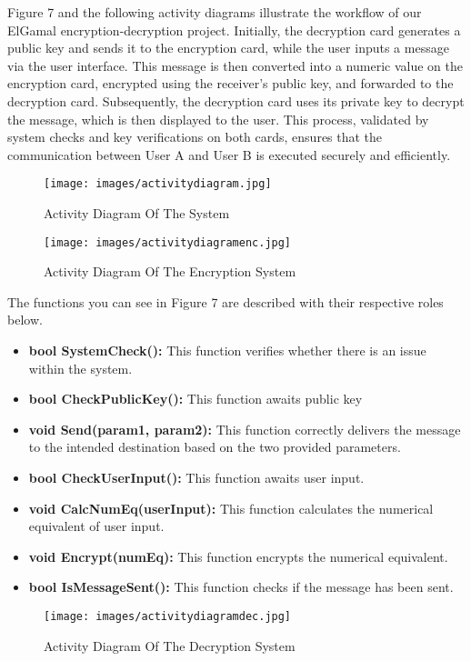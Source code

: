 \documentclass[12pt]{article}
\begin{document}
	Figure 7 and the following activity diagrams illustrate the workflow of our ElGamal encryption-decryption project. Initially, the decryption card generates a public key and sends it to the encryption card, while the user inputs a message via the user interface. This message is then converted into a numeric value on the encryption card, encrypted using the receiver's public key, and forwarded to the decryption card. Subsequently, the decryption card uses its private key to decrypt the message, which is then displayed to the user. This process, validated by system checks and key verifications on both cards, ensures that the communication between User A and User B is executed securely and efficiently.
	\begin{figure}[H]
		\centering
		\label{Uml Diagram Of The System}
		\texttt{[image: images/activitydiagram.jpg]}\\[0.5 cm]	
		\caption{Activity Diagram Of The System} 		
	\end{figure}
	\newpage
	\begin{figure}[H]
		\centering
		\label{Enc Diagram}
		\texttt{[image: images/activitydiagramenc.jpg]}\\[0.5 cm]	
		\caption{Activity Diagram Of The Encryption System } 		
	\end{figure}
	The functions you can see in Figure 7 are described with their respective roles below.
	\begin{itemize}
		\item \textbf{bool SystemCheck():} This function verifies whether there is an issue within the system.
		\item \textbf{bool CheckPublicKey():} This function awaits public key
		\item \textbf{void Send(param1, param2):} 
		This function correctly delivers the message to the intended destination based on the two provided parameters.
		\item \textbf{bool CheckUserInput():}  This function awaits user input.
		\item \textbf{void CalcNumEq(userInput):} This function calculates the numerical equivalent of user input.
		\item \textbf{void Encrypt(numEq):} This function encrypts the numerical equivalent.
		\item \textbf {bool IsMessageSent():} This function checks if the message has been sent.
	\end{itemize}
	\newpage
	\begin{figure}[H]
		\centering
		\label{dec Diagram}
		\texttt{[image: images/activitydiagramdec.jpg]}\\[0.5 cm]	
		\caption{Activity Diagram Of The Decryption System } 		
	\end{figure}
\end{document}
